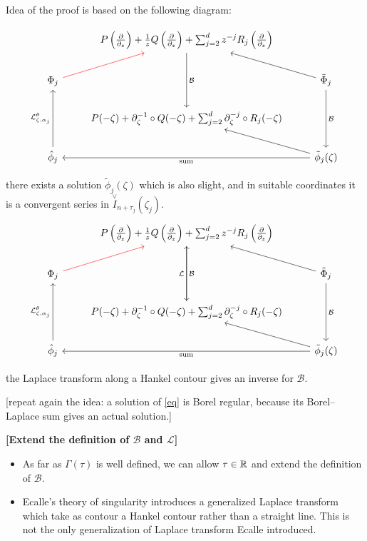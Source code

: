 \documentclass[11pt,a4paper,twoside,leqno,noamsfonts]{amsart}
\numberwithin{equation}{section}
\begin{document}
Idea of the proof is based on the following diagram: 

\[
\begin{tikzcd}
& P\left(\frac{\partial}{\partial_z}\right)+\frac{1}{z}Q\left(\frac{\partial}{\partial_z}\right)+\sum_{j=2}^dz^{-j}R_j\left(\frac{\partial}{\partial_z}\right)\arrow[dd,"\mathcal{B}"] & \\
\Phi_j\arrow[ru,red] & & \tilde{\Phi}_j\arrow[lu]\arrow[dd, "\mathcal{B}"] \\
&P(-\zeta)+\partial_\zeta^{-1}\circ Q(-\zeta)+\sum_{j=2}^d \partial_\zeta^{-j}\circ R_j(-\zeta) & \\
\hat{\phi}_j\arrow[uu,  "\mathcal{L}_{\zeta,\alpha_j}^\theta"]& & \tilde{\phi}_j(\zeta)\arrow[ll,"\text{sum}"]\arrow[ul] 
\end{tikzcd}
\]

there exists a solution $\tilde{\phi}_j(\zeta)$ which is also slight, and in suitable coordinates it is a convergent series in $\overset{\vee}{I}_{n+\tau_j}(\zeta_j)$.  
\[
\begin{tikzcd}
& P\left(\frac{\partial}{\partial_z}\right)+\frac{1}{z}Q\left(\frac{\partial}{\partial_z}\right)+\sum_{j=2}^dz^{-j}R_j\left(\frac{\partial}{\partial_z}\right)\arrow[dd,"\mathcal{B}"] & \\
\Phi_j\arrow[ru,red] & & \tilde{\Phi}_j\arrow[lu]\arrow[dd, "\mathcal{B}"] \\
&P(-\zeta)+\partial_\zeta^{-1}\circ Q(-\zeta)+\sum_{j=2}^d \partial_\zeta^{-j}\circ R_j(-\zeta)\arrow[uu,"\mathcal{L}"] & \\
\hat{\phi}_j\arrow[uu,  "\mathcal{L}_{\zeta,\alpha_j}^\theta"]& & \tilde{\phi}_j(\zeta)\arrow[ll,"\text{sum}"] \arrow[ul] 
\end{tikzcd}
\]

the Laplace transform along a Hankel contour gives an inverse for $\mathcal{B}$. 

[repeat again the idea: a solution of \eqref{eq} is Borel regular, because its Borel--Laplace sum gives an actual solution.]

\begin{remark}
\textbf{[Extend the definition of $\mathcal{B}$ and $\mathcal{L}$]}
\begin{itemize}
\item As far as $\Gamma(\tau)$ is well defined, we can allow $\tau\in\mathbb R$ and extend the definition of $\mathcal{B}$. 
\item Ecalle's theory of singularity introduces a generalized Laplace transform which take as contour a Hankel contour rather than a straight line. This is not the only generalization of Laplace transform Ecalle introduced. 
\end{itemize}
\end{remark}
\end{document}

